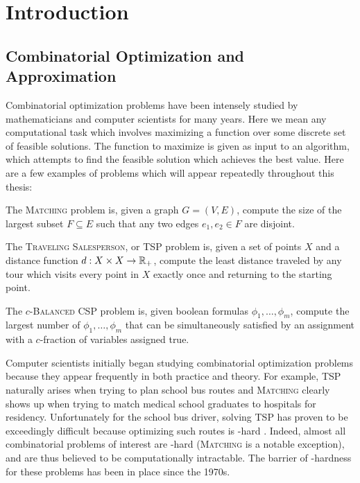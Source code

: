 \chapter{Introduction}\label{cha:introduction}

\section{Combinatorial Optimization and Approximation}
Combinatorial optimization problems have been intensely studied by mathematicians and computer scientists for many years.
Here we mean any computational task which involves maximizing a function over some discrete set of feasible solutions.
The function to maximize is given as input to an algorithm, which attempts to find the feasible solution which achieves the best value. 
Here are a few examples of problems which will appear repeatedly throughout this thesis: 
\begin{example}
The \textsc{Matching} problem is, given a graph $G = (V,E)$, compute the size of the largest subset $F \subseteq E$ such that any two edges $e_1,e_2 \in F$ are disjoint.
\end{example}
\begin{example}
The \textsc{Traveling Salesperson}, or \textsc{TSP} problem is, given a set of points $X$ and a distance function $d: X \times X \rightarrow \mathbb R_+$, compute the least distance traveled by any tour which visits every point in $X$ exactly once and returning to the starting point.
\end{example}
\begin{example}
The \textsc{$c$-Balanced CSP} problem is, given boolean formulas $\phi_1,\dots,\phi_m$, compute the largest number of $\phi_1,\dots,\phi_m$ that can be simultaneously satisfied by an assignment with a $c$-fraction of variables assigned true.
\end{example}

Computer scientists initially began studying combinatorial optimization problems because they appear frequently in both practice and theory.
For example, \textsc{TSP} naturally arises when trying to plan school bus routes and \textsc{Matching} clearly shows up when trying to match medical school graduates to hospitals for residency. Unfortunately for the school bus driver, solving \textsc{TSP} has proven to be exceedingly difficult because optimizing such routes is \np-hard \cite{Karp1972}. Indeed, almost all combinatorial problems of interest are \np-hard (\textsc{Matching} is a notable exception), and are thus believed to be computationally intractable. The barrier of \np-hardness for these problems has been in place since the 1970s.

